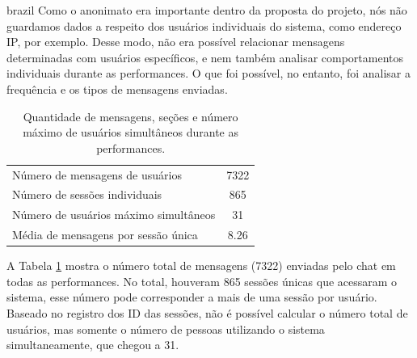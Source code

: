 \begin{otherlanguage*}{brazil}
Como o anonimato era importante dentro da proposta do projeto, nós não guardamos dados a respeito dos usuários individuais do sistema, como endereço IP, por exemplo. Desse modo, não era possível relacionar mensagens determinadas com usuários específicos, e nem também analisar comportamentos individuais durante as performances. O que foi possível, no entanto, foi analisar a frequência e os tipos de mensagens enviadas.


\begin{table}[ht!]
\caption{Quantidade de mensagens, seções e número máximo de usuários simultâneos durante as performances.}{%
\begin{tabular}{@{}lc@{}}\hline
 Número de mensagens de usuários & 7322\\
 Número de sessões individuais & 865\\
 Número de usuários máximo simultâneos & 31\\
 Média de mensagens por sessão única & 8.26\\
\end{tabular}}
\label{tab:overallmsg}
\end{table}

A Tabela \ref{tab:overallmsg} mostra o número total de mensagens (7322) enviadas pelo chat em todas as performances. No total, houveram 865 sessões únicas que acessaram o sistema, esse número pode corresponder a mais de uma sessão por usuário. Baseado no registro dos ID das sessões, não é possível calcular o número total de usuários, mas somente o número de pessoas utilizando o sistema simultaneamente, que chegou a 31.



\end{otherlanguage*}
